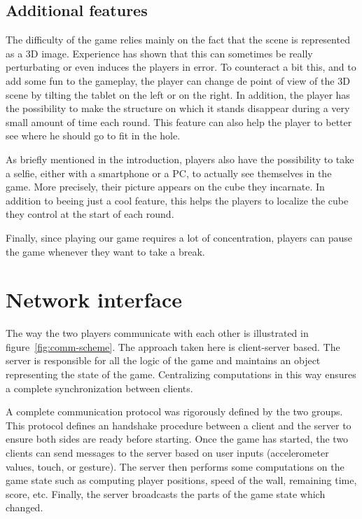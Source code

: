 \documentclass[english, DIV=13]{scrartcl}
\begin{document}
\subsection{Additional features}
The difficulty of the game relies mainly on the fact that the scene is represented as a
3D image. Experience has shown that this can sometimes be really perturbating or even
induces the players in error. To counteract a bit this, and to add some fun to the
gameplay, the player can change de point of view of the 3D scene by tilting the tablet
on the left or on the right. In addition, the player has the possibility to make the
structure on which it stands disappear during a very small amount of time each round.
This feature can also help the player to better see where he should go to fit in the hole.

As briefly mentioned in the introduction, players also have the possibility to take a
selfie, either with a smartphone or a PC, to actually see themselves in the game. More
precisely, their picture appears on the cube they incarnate. In addition to beeing just a
cool feature, this helps the players to localize the cube they control at the start of
each round.

Finally, since playing our game requires a lot of concentration, players can pause the
game whenever they want to take a break.

\section{Network interface}
\label{sec:net-interface}
The way the two players communicate with each other is illustrated in figure~\ref{fig:comm-scheme}.
The approach taken here is client-server based. The server is responsible
for all the logic of the game and maintains an object representing the state of the game.
Centralizing computations in this way ensures a complete synchronization between clients.

A complete communication protocol was rigorously defined by the two groups. This
protocol defines an handshake procedure between a client and the server to ensure both
sides are ready before starting. Once the game has started, the two clients can send
messages to the server based on user inputs (accelerometer values, touch, or gesture).
The server then performs some computations on the game state such as computing player
positions, speed of the wall, remaining time, score, etc. Finally, the server
broadcasts the parts of the game state which changed.
\end{document}
